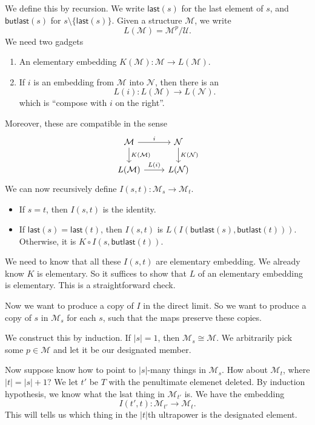 \documentclass[a4paper]{article}
\newcommand\last{\mathsf{last}}
\newcommand\butlast{\mathsf{butlast}}
\begin{document}
We define this by recursion. We write $\last(s)$ for the last element of $s$, and $\butlast(s)$ for $s \setminus \{\last(s)\}$. Given a structure $\mathcal{M}$, we write
\[
  L(\mathcal{M}) = \mathcal{M}^p/\mathcal{U}.
\]
We need two gadgets
\begin{enumerate}
  \item An elementary embedding $K(\mathcal{M}): \mathcal{M} \to L(\mathcal{M})$.
  \item If $i$ is an embedding from $\mathcal{M}$ into $\mathcal{N}$, then there is an
    \[
      L(i): L(\mathcal{M}) \to L(\mathcal{N}).
    \]
    which is ``compose with $i$ on the right''.
\end{enumerate}
Moreover, these are compatible in the sense
\[
  \begin{tikzcd}
    \mathcal{M} \ar[r, "i"] \ar[d, "K(\mathcal{M})"] & \mathcal{N} \ar[d, "K(\mathcal{N})"]\\
    L(\mathcal{M}) \ar[r, "L(i)"] & L(\mathcal{N})
  \end{tikzcd}
\]
We can now recursively define $I(s, t): \mathcal{M}_s \to \mathcal{M}_t$.
\begin{itemize}
  \item If $s = t$, then $I(s, t)$ is the identity.
  \item If $\last(s) = \last(t)$, then $I(s, t)$ is $L(I(\butlast(s), \butlast(t)))$. Otherwise, it is $K \circ I(s, \butlast(t))$.
\end{itemize}

We need to know that all these $I(s, t)$ are elementary embedding. We already know $K$ is elementary. So it suffices to show that $L$ of an elementary embedding is elementary. This is a straightforward check.

Now we want to produce a copy of $I$ in the direct limit. So we want to produce a copy of $s$ in $\mathcal{M}_s$ for each $s$, such that the maps preserve these copies.

We construct this by induction. If $|s| = 1$, then $\mathcal{M}_s \cong \mathcal{M}$. We arbitrarily pick some $p \in \mathcal{M}$ and let it be our designated member.

Now suppose know how to point to $|s|$-many things in $\mathcal{M}_s$. How about $\mathcal{M}_t$, where $|t| = |s| + 1$? We let $t'$ be $T$ with the penultimate elemenet deleted. By induction hypothesis, we know what the lsat thing in $\mathcal{M}_{t'}$ is. We have the embedding
\[
  I(t', t): \mathcal{M}_{t'} \to \mathcal{M}_t.
\]
This will tells us which thing in the $|t|$th ultrapower is the designated element. %
\end{document}
